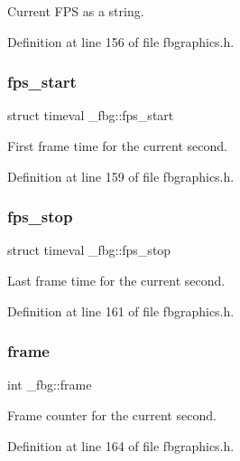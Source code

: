 Current F\+PS as a string. 



Definition at line 156 of file fbgraphics.\+h.

\mbox{\label{struct__fbg_a07d7bb827a7595c956fe22c2d65bba33}} 
\subsubsection{\texorpdfstring{fps\+\_\+start}{fps\_start}}
{\footnotesize\ttfamily struct timeval \+\_\+fbg\+::fps\+\_\+start}



First frame time for the current second. 



Definition at line 159 of file fbgraphics.\+h.

\mbox{\label{struct__fbg_ade17a45bbc82bef326857c2837cdf66c}} 
\subsubsection{\texorpdfstring{fps\+\_\+stop}{fps\_stop}}
{\footnotesize\ttfamily struct timeval \+\_\+fbg\+::fps\+\_\+stop}



Last frame time for the current second. 



Definition at line 161 of file fbgraphics.\+h.

\mbox{\label{struct__fbg_aa3ef83f919d12e680f8c64006b441454}} 
\subsubsection{\texorpdfstring{frame}{frame}}
{\footnotesize\ttfamily int \+\_\+fbg\+::frame}



Frame counter for the current second. 



Definition at line 164 of file fbgraphics.\+h.

